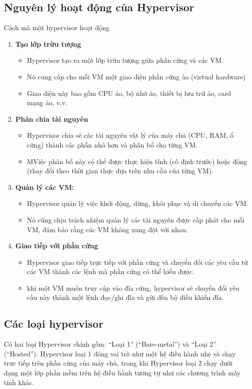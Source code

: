 \documentclass[a4paper,12pt]{article}
\begin{document}
\subsection{Nguyên lý hoạt động của Hypervisor}
\noindent Cách mà một hypervisor hoạt động
\begin{enumerate}
\item \textbf{Tạo lớp trừu tượng}
\begin{itemize}
\item Hypervisor tạo ra một lớp trừu tượng giữa phần cứng và các VM.
\item Nó cung cấp cho mỗi VM một giao diện phần cứng ảo (virtual hardware)
\item Giao diện này bao gồm CPU ảo, bộ nhớ ảo, thiết bị lưu trữ ảo, card mạng ảo, v.v.
\end{itemize}
\item \textbf{Phân chia tài nguyên}
\begin{itemize}
\item Hypervisor chia sẻ các tài nguyên vật lý của máy chủ (CPU, RAM, ổ cứng) thành các phần nhỏ hơn và phân bổ cho từng VM.
\item MViệc phân bổ này có thể được thực hiện tĩnh (cố định trước) hoặc động (thay đổi theo thời gian thực dựa trên nhu cầu của từng VM).
\end{itemize}
\item \textbf{Quản lý các VM:}
\begin{itemize}
\item Hypervisor quản lý việc khởi động, dừng, khôi phục và di chuyển các VM.
\item Nó cũng chịu trách nhiệm quản lý các tài nguyên được cấp phát cho mỗi VM, đảm bảo rằng các VM không xung đột với nhau.
\end{itemize}
\item \textbf{Giao tiếp với phần cứng}
\begin{itemize}
\item Hypervisor giao tiếp trực tiếp với phần cứng và chuyển đổi các yêu cầu từ các VM thành các lệnh mà phần cứng có thể hiểu được.
\item khi một VM muốn truy cập vào đĩa cứng, hypervisor sẽ chuyển đổi yêu cầu này thành một lệnh đọc/ghi đĩa và gửi đến bộ điều khiển đĩa.
\end{itemize}
\end{enumerate}



\subsection{ Các loại hypervisor}
Có hai loại Hypervisor chính gồm: “Loại 1” (“Bare-metal”) và “Loại 2” (“Hosted”). Hypervisor loại 1 đóng vai trò
như một hệ điều hành nhẹ và chạy trưc tiếp trên phần cứng của máy chủ, trong khi Hypervisor loại 2 chạy dưới dạng
một lớp phần mềm trên hệ điều hành tương tự như các chương trình máy tính khác.
\end{document}

